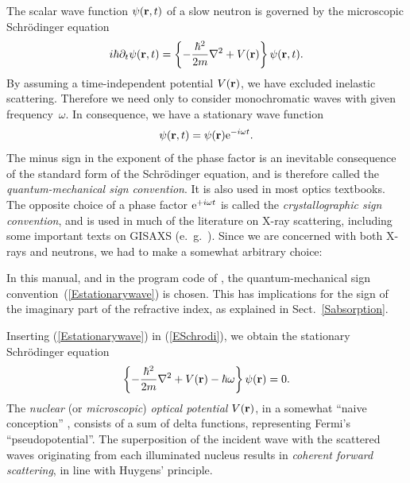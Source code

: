 %
The scalar wave function $\psi(\mathbf{r},t)$
%
%
%
of a slow neutron is governed by the microscopic Schrödinger equation
\begin{equation}\label{ESchrodi}
  i\hbar\partial_t \psi(\mathbf{r},t)
  = \left\{-\frac{\hbar^2}{2m}\mathbf{\nabla}^2+V(\mathbf{r})\right\} \psi(\mathbf{r},t).
\end{equation}
By assuming a time-independent potential $V(\mathbf{r})$,
we have excluded inelastic scattering.
Therefore we need only to consider monochromatic waves
with given frequency~$\omega$.
%
In consequence, we have a stationary wave function
\begin{equation}\label{Estationarywave}
  \psi(\mathbf{r},t) = \psi(\mathbf{r})\text{e}^{-i\omega t}.
\end{equation}
%
The minus sign in the exponent of the phase factor
is an inevitable consequence of the standard form of the Schrödinger equation,
and is therefore called the \textit{quantum-mechanical sign convention}.
It is also used in most optics textbooks.
%
%
The opposite choice of a phase factor $\text{e}^{+i\omega t}$ is 
called the \textit{crystallographic sign convention},
and is used in much of the literature on X-ray scattering,
including some important texts on GISAXS (e.~g.\ \cite{ReLL09}).
Since we are concerned with both X-rays and neutrons,
we had to make a somewhat arbitrary choice:

\Note
{\indent In this manual, and in the program code of \BornAgain,
the quantum-mechanical sign convention~(\ref{Estationarywave}) is chosen.
This has implications for the sign of the imaginary part of the
refractive index,
%
as explained in Sect.~\ref{Sabsorption}.}

Inserting (\ref{Estationarywave}) in (\ref{ESchrodi}),
we obtain the stationary Schrödinger equation
\begin{equation}\label{EstatSchrodi}
  \left\{-\frac{\hbar^2}{2m}\mathbf{\nabla}^2+V(\mathbf{r})-\hbar\omega\right\} \psi(\mathbf{r}) = 0.
\end{equation}
%
%
%
%
The \textit{nuclear} (or \textit{microscopic})
\textit{optical potential} $V(\mathbf{r})$,
in a somewhat ``naive conception'' \cite[p.~7]{Sea89},
consists of a sum of delta functions,
representing Fermi's ``pseudopotential''.
%
The superposition of the incident wave with the scattered waves
originating from each illuminated nucleus
results in \textit{coherent forward scattering},
%
in line with Huygens' principle.
%

